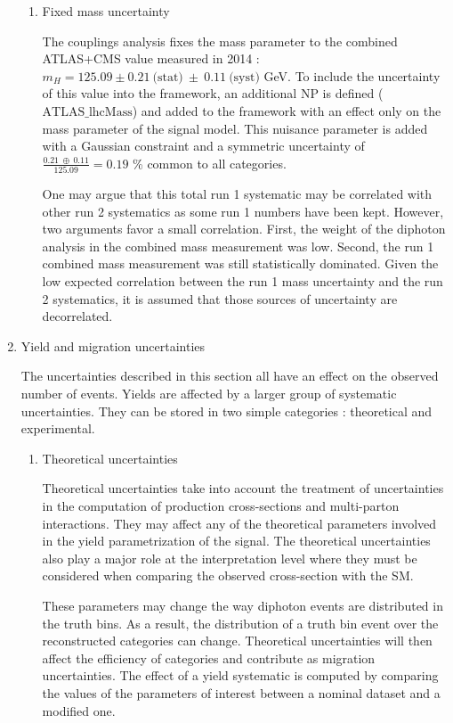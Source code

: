 \begin{enumerate}
\begin{enumerate}
\item Fixed mass uncertainty
\label{sec:org220d36d}
\label{subsec:FixedMass}

The couplings analysis fixes the mass parameter to the combined ATLAS+CMS value measured in 2014 \cite{CERN-PH-EP-2015-075} : $m_{H}=125.09 \pm 0.21\ \text{(stat)} \  \pm \  0.11\ \text{(syst)}$ GeV.
To include the uncertainty of this value into the framework, an additional NP is defined (\(\text{ATLAS\_lhcMass}\)) and added to the framework with an effect only on the mass parameter of the signal model.
This nuisance parameter is added with a Gaussian constraint and a symmetric uncertainty of \(\frac{0.21\ \oplus\ 0.11}{125.09}=0.19\) \% common to all categories.

One may argue that this total run 1 systematic may be correlated with other run 2 systematics as some run 1 numbers have been kept.
However, two arguments favor a small correlation.
First, the weight of the diphoton analysis in the combined mass measurement was low.
Second, the run 1 combined mass measurement was still statistically dominated.
Given the low expected correlation between the run 1 mass uncertainty and the run 2 systematics, it is assumed that those sources of uncertainty are decorrelated.
\end{enumerate}

\item Yield and migration uncertainties
  \label{sec:org17f2003}

The uncertainties described in this section all have an effect on the observed number of events.
Yields are affected by a larger group of systematic uncertainties.
They can be stored in two simple categories : theoretical and experimental.


\begin{enumerate}
\item Theoretical uncertainties
  \label{sec:orgdba6640}

Theoretical uncertainties take into account the treatment of uncertainties in the computation of production cross-sections and multi-parton interactions.
They may affect any of the theoretical parameters involved in the yield parametrization of the signal.
The theoretical uncertainties also play a major role at the interpretation level where they must be considered when comparing the observed cross-section with the SM.

These parameters may change the way diphoton events are distributed in the truth bins.
As a result, the distribution of a truth bin event over the reconstructed categories can change.
Theoretical uncertainties will then affect the efficiency of categories and contribute as migration uncertainties.
The effect of a yield systematic is computed by comparing the values of the parameters of interest between a nominal dataset and a modified one.


\end{enumerate}
\end{enumerate}
